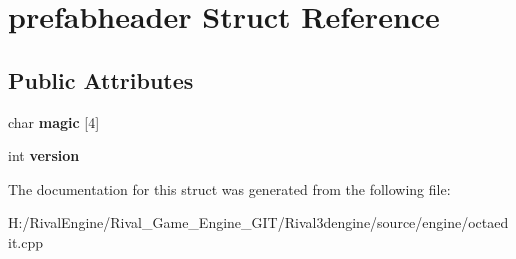 \hypertarget{structprefabheader}{}\section{prefabheader Struct Reference}
\label{structprefabheader}
\subsection*{Public Attributes}
\begin{DoxyCompactItemize}
\item 
\mbox{\label{structprefabheader_a2fc296febaece9fbbfaad07982decc13}} 
char {\bfseries magic} \mbox{[}4\mbox{]}
\item 
\mbox{\label{structprefabheader_a1344c8a3b067e2bd77284fe508d3e32b}} 
int {\bfseries version}
\end{DoxyCompactItemize}


The documentation for this struct was generated from the following file\+:\begin{DoxyCompactItemize}
\item 
H\+:/\+Rival\+Engine/\+Rival\+\_\+\+Game\+\_\+\+Engine\+\_\+\+G\+I\+T/\+Rival3dengine/source/engine/octaedit.\+cpp\end{DoxyCompactItemize}
